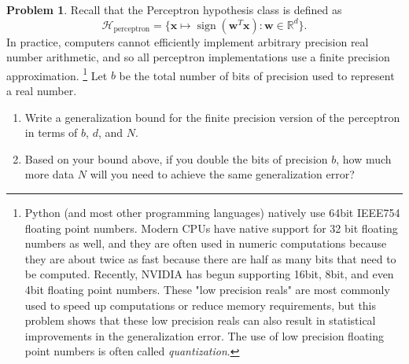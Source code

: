 \documentclass[10pt]{exam}
\theoremstyle{definition}
\newtheorem{problem}{Problem}
\newcommand{\R}{\mathbb R}
\DeclareMathOperator{\sign}{sign}
\newcommand{\trans}[1]{{#1}^{T}}
\newcommand{\w}{\mathbf w}
\newcommand{\x}{\mathbf x}
\newcommand{\HH}[1]{\mathcal H_{\text{#1}}}
\newcommand{\Hperceptron}{\HH_{\text{perceptron}}}
\begin{document}
\newpage
\begin{problem}
    Recall that the Perceptron hypothesis class is defined as
    \begin{equation}
        \HH{perceptron} = 
        \bigg\{ \x \mapsto \sign(\trans\w \x) : \w \in \R^d \bigg\}.
    \end{equation}
    In practice, computers cannot efficiently implement arbitrary precision real number arithmetic,
    and so all perceptron implementations use a finite precision approximation.%
    \footnote{
    Python (and most other programming languages) natively use 64bit IEEE754 floating point numbers.
    Modern CPUs have native support for 32 bit floating numbers as well,
    and they are often used in numeric computations because they are about twice as fast because there are half as many bits that need to be computed.
    Recently, NVIDIA has begun supporting 16bit, 8bit, and even 4bit floating point numbers.
    These "low precision reals" are most commonly used to speed up computations or reduce memory requirements,
    but this problem shows that these low precision reals can also result in statistical improvements in the generalization error.
    The use of low precision floating point numbers is often called \emph{quantization}.
    }
    Let $b$ be the total number of bits of precision used to represent a real number.

    \begin{enumerate}
        \item
    Write a generalization bound for the finite precision version of the perceptron in terms of $b$, $d$, and $N$.

    \item
        \vspace{3in}
        Based on your bound above, if you double the bits of precision $b$, how much more data $N$ will you need to achieve the same generalization error?

    \end{enumerate}

\end{problem}
\end{document}
